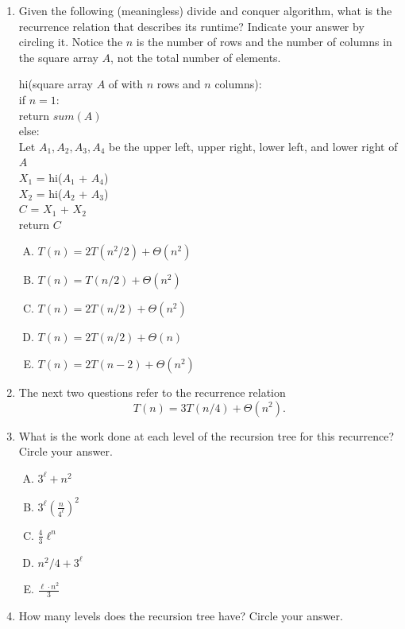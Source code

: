 \documentclass[11pt]{article}
\begin{document}
\begin{enumerate}
\item Given the following (meaningless) divide and conquer algorithm,
what is the recurrence relation that describes its runtime? Indicate your answer by circling it.
Notice the $n$ is the number of rows and the number of columns in the square array $A$,
not the total number of elements.

    \begin{algo}
    hi(square array $A$ of with $n$ rows and $n$ columns): \+ \\
    if $n = 1$:\+\\
        return $sum(A)$\-\\
    else:\+\\
    Let $A_1, A_2, A_3, A_4$ be the upper left, upper right, lower left, and lower right of $A$\\
    $X_1$ = hi($A_1$ + $A_4$)\\
    $X_2$ = hi($A_2$ + $A_3$)\\
    $C$ = $X_1$ + $X_2$\\
    return $C$\-\\
    \end{algo}

\begin{enumerate}[A.]
    \item $T(n) = 2T(n^2/2) + \Theta(n^2)$
    \item $T(n) = T(n/2) + \Theta(n^2)$
    \item $T(n) = 2T(n/2) + \Theta(n^2)$
    \item $T(n) = 2T(n/2) + \Theta(n)$
    \item $T(n) = 2T(n-2) + \Theta(n^2)$
\end{enumerate}

\item[] The next two questions refer to the recurrence relation
\[T(n) = 3T(n/4) + \Theta(n^2).
\]
\item What is the work done at each level of the recursion tree for this recurrence? Circle your answer.
\begin{enumerate}[A.]
    \item $3^{\ell} + n^2$
    \item $3^{\ell} \left(\frac{n}{4^\ell}\right)^2$
    \item $\frac{4}{3} \ell^n$
    \item $n^2/4 + 3^\ell$
    \item $\frac{\ell \cdot n^2}{3}$
\end{enumerate}

\item How many levels does the recursion tree have? Circle your answer.


\end{enumerate}
\end{document}
